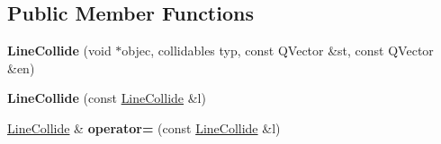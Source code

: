 \subsection*{Public Member Functions}
\begin{DoxyCompactItemize}
\item 
{\bfseries Line\+Collide} (void $\ast$objec, collidables typ, const Q\+Vector \&st, const Q\+Vector \&en)\hypertarget{structLineCollide_ad57ac908b8d9f73f9a9ae47bf14fb594}{}\label{structLineCollide_ad57ac908b8d9f73f9a9ae47bf14fb594}

\item 
{\bfseries Line\+Collide} (const \hyperlink{structLineCollide}{Line\+Collide} \&l)\hypertarget{structLineCollide_ab4543d2ff9c9a93ea7fe8ec546f3d205}{}\label{structLineCollide_ab4543d2ff9c9a93ea7fe8ec546f3d205}

\item 
\hyperlink{structLineCollide}{Line\+Collide} \& {\bfseries operator=} (const \hyperlink{structLineCollide}{Line\+Collide} \&l)\hypertarget{structLineCollide_a38ff1d57c90273dc2c2293fe47cd6a96}{}\label{structLineCollide_a38ff1d57c90273dc2c2293fe47cd6a96}

\end{DoxyCompactItemize}
